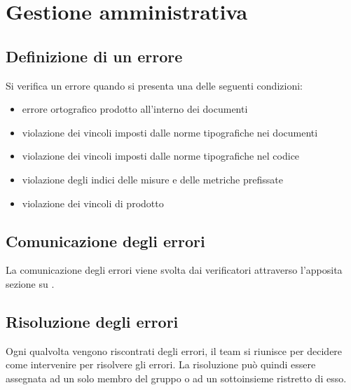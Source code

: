 \documentclass[../PianoDiQualifica.tex]{subfiles}
\begin{document}
\section{Gestione amministrativa}
	\subsection{Definizione di un errore}
		Si verifica un errore quando si presenta una delle seguenti condizioni:
		\begin{itemize}
			\item errore ortografico prodotto all'interno dei documenti
			\item violazione dei vincoli imposti dalle norme tipografiche nei documenti
			\item violazione dei vincoli imposti dalle norme tipografiche nel codice
			\item violazione degli indici delle misure e delle metriche prefissate
			\item violazione dei vincoli di prodotto
		\end{itemize}
	\subsection{Comunicazione degli errori}
		La comunicazione degli errori viene svolta dai verificatori attraverso l'apposita sezione su .
	\subsection{Risoluzione degli errori}
		Ogni qualvolta vengono riscontrati degli errori, il team si riunisce per decidere come intervenire per risolvere  gli errori. La risoluzione può quindi essere assegnata ad un solo membro del gruppo o ad un sottoinsieme ristretto di esso.
\end{document}
